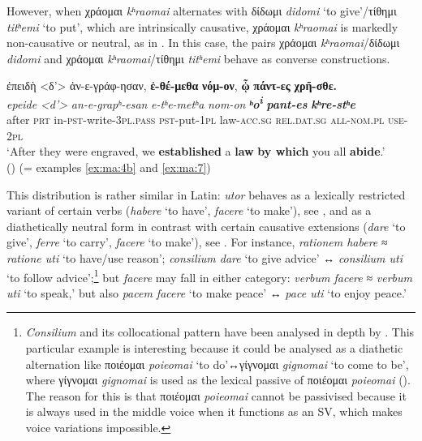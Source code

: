 \documentclass[output=paper,colorlinks,citecolor=brown]{langscibook}
\begin{document}
However, when χράομαι \emph{kʰraomai} alternates with δίδωμι
\emph{didomi} `to give'/τίθημι \emph{titʰemi} `to put', which are
intrinsically causative, χράομαι \emph{kʰraomai} is markedly
non-causative or neutral, as in . In this case, the pairs χράομαι
\emph{kʰraomai}/δίδωμι \emph{didomi} and χράομαι
\emph{kʰraomai}/τίθημι \emph{titʰemi} behave as
converse constructions.


\ea\label{ex:ma:12}

\glll ἐπειδὴ <δ'> ἀν-ε-γράφ-ησαν, \textbf{ἐ-θέ-μεθα} \textbf{νόμ-ον}, \textbf{ᾧ} \textbf{πάντ-ες} \textbf{χρῆ-σθε.}\\
 \textit{epeide} \textit{<d'>} \textit{an-e-grapʰ-esan} \textit{e-tʰe-metʰa} \textit{nom-on} \textit{\textbf{ʰo\textsuperscript{i}}} \textit{\textbf{pant-es}}
\textit{\textbf{kʰre-stʰe}}\\
after \textsc{prt} in-\textsc{pst-}write-\textsc{3pl.pass} \textsc{pst-}put-\textsc{1pl}
law-\textsc{acc.sg} \textsc{rel.dat.sg} \textsc{all-nom.pl} \textsc{use-2pl}\\
\glt `After they were engraved, we \textbf{established} a \textbf{law} \textbf{by which} you all \textbf{abide}.' \\
\hspace*{\fill}() (= examples \ref{ex:ma:4b} and \ref{ex:ma:7})

\z

This distribution is rather similar in Latin: \emph{utor} behaves as a lexically
restricted variant of certain verbs (\emph{habere} `to have', \emph{facere} `to make'), see
, and as a diathetically neutral form in contrast with certain causative
extensions (\emph{dare} `to give', \emph{ferre} `to carry', \emph{facere} `to make'), see
. For instance, \emph{rationem habere} ≈ \emph{ratione uti} `to have/use
reason'; \emph{consilium dare} `to give advice' ↔ \emph{consilium uti} `to follow
advice';\footnote{\emph{Consilium} and its collocational pattern have been analysed in
  depth by \citet{banos_construcciones_2014}. This particular example is interesting
  because it could be analysed as a diathetic alternation like ποιέομαι \emph{poieomai}
  `to do'↔γίγνομαι \emph{gignomai} `to come to be', where γίγνομαι \emph{gignomai} is used
  as the lexical passive of ποιέομαι \emph{poieomai} (\cite{jimenez_lopez__2021}). The
  reason for this is that ποιέομαι \emph{poieomai} cannot be passivised because it is always used in the
  middle voice when it functions as an SV, which makes voice variations impossible.} but
\emph{facere} may fall in either category: \emph{verbum facere} ≈ \emph{verbum uti} `to
speak,' but also \emph{pacem facere} `to make peace' ↔ \emph{pace uti} `to enjoy peace.'
\end{document}
